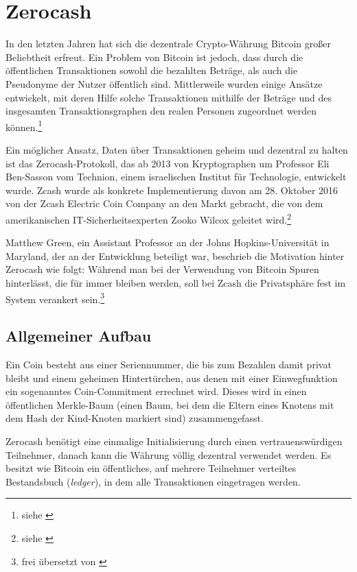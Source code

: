 \section{Zerocash}

In den letzten Jahren hat sich die dezentrale Crypto-Währung Bitcoin großer Beliebtheit erfreut. Ein Problem von Bitcoin ist jedoch, dass durch die öffentlichen Transaktionen sowohl die bezahlten Beträge, als auch die Pseudonyme der Nutzer öffentlich sind. Mittlerweile wurden einige Ansätze entwickelt, mit deren Hilfe solche Transaktionen mithilfe der Beträge und des insgesamten Transaktionsgraphen den realen Personen zugeordnet werden können.\footnote{siehe \cite[Seite 3]{zerocash}}

Ein möglicher Ansatz, Daten über Transaktionen geheim und dezentral zu halten ist das Zerocash-Protokoll, das ab 2013 von Kryptographen um Professor Eli Ben-Sasson vom Technion, einem israelischen Institut für Technologie, entwickelt wurde. Zcash wurde als konkrete Implementierung davon am 28. Oktober 2016 von der Zcash Electric Coin Company an den Markt gebracht, die von dem amerikanischen IT-Sicherheitsexperten Zooko Wilcox geleitet wird.\footnote{siehe \cite{nytimeszcash}}

Matthew Green, ein Assistant Professor an der Johns Hopkins-Universität in Maryland, der an der Entwicklung beteiligt war, beschrieb die Motivation hinter Zerocash wie folgt: \glqq{}Während man bei der Verwendung von Bitcoin Spuren hinterlässt, die für immer bleiben werden, soll bei Zcash die Privatsphäre fest im System verankert sein.\grqq{}\footnote{frei übersetzt von \cite{nytimeszcash}}

\subsection{Allgemeiner Aufbau}
Ein Coin besteht aus einer Seriennummer, die bis zum Bezahlen damit privat bleibt und einem geheimen Hintertürchen, aus denen mit einer Einwegfunktion ein sogenanntes Coin-Commitment errechnet wird. Dieses wird in einen öffentlichen Merkle-Baum (einen Baum, bei dem die Eltern eines Knotens mit dem Hash der Kind-Knoten markiert sind) zusammengefasst.

Zerocash benötigt eine einmalige Initialisierung durch einen vertrauenswürdigen Teilnehmer, danach kann die Währung völlig dezentral verwendet werden. Es besitzt wie Bitcoin ein öffentliches, auf mehrere Teilnehmer verteiltes Bestandsbuch (\textit{ledger}), in dem alle Transaktionen eingetragen werden.

